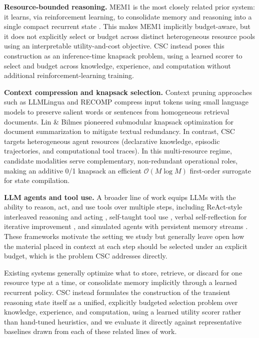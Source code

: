 \documentclass{article}
\begin{document}
\textbf{Resource-bounded reasoning.} MEM1 is the most closely related prior system: it learns, via reinforcement learning, to consolidate memory and reasoning into a single compact recurrent state \citep{zhou2025mem1}. This makes MEM1 implicitly budget-aware, but it does not explicitly select or budget across distinct heterogeneous resource pools using an interpretable utility-and-cost objective. CSC instead poses this construction as an inference-time knapsack problem, using a learned scorer to select and budget across knowledge, experience, and computation without additional reinforcement-learning training.

\textbf{Context compression and knapsack selection.} Context pruning approaches such as LLMLingua \citep{jiang2023llmlingua} and RECOMP \citep{xu2023recomp} compress input tokens using small language models to preserve salient words or sentences from homogeneous retrieval documents. Lin \& Bilmes \citep{lin2010submodular} pioneered submodular knapsack optimization for document summarization to mitigate textual redundancy. In contrast, CSC targets heterogeneous agent resources (declarative knowledge, episodic trajectories, and computational tool traces). In this multi-resource regime, candidate modalities serve complementary, non-redundant operational roles, making an additive 0/1 knapsack an efficient $\mathcal{O}(M \log M)$ first-order surrogate for state compilation.

\textbf{LLM agents and tool use.} A broader line of work equips LLMs with the ability to reason, act, and use tools over multiple steps, including ReAct-style interleaved reasoning and acting \citep{yao2023react}, self-taught tool use \citep{schick2023toolformer}, verbal self-reflection for iterative improvement \citep{shinn2023reflexion}, and simulated agents with persistent memory streams \citep{park2023generative}. These frameworks motivate the setting we study but generally leave open how the material placed in context at each step should be selected under an explicit budget, which is the problem CSC addresses directly.

Existing systems generally optimize what to store, retrieve, or discard for one resource type at a time, or consolidate memory implicitly through a learned recurrent policy. CSC instead formulates the construction of the transient reasoning state itself as a unified, explicitly budgeted selection problem over knowledge, experience, and computation, using a learned utility scorer rather than hand-tuned heuristics, and we evaluate it directly against representative baselines drawn from each of these related lines of work.
\end{document}

